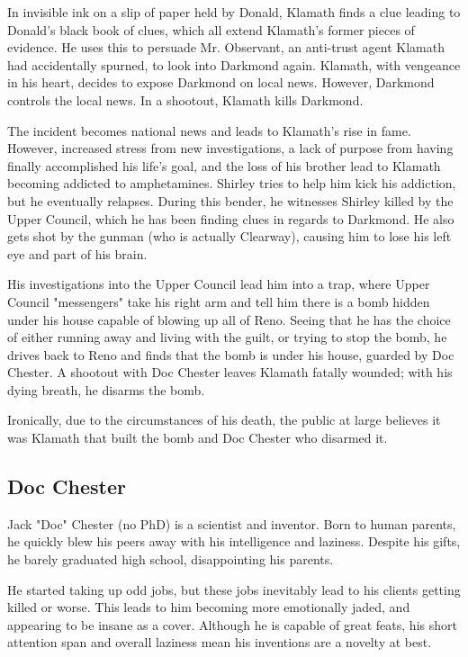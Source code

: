 \documentclass{article}
\begin{document}
In invisible ink on a slip of paper held by Donald, Klamath finds a clue leading to Donald's black book of clues, which all extend Klamath's former pieces of evidence. He uses this to persuade Mr. Observant, an anti-trust agent Klamath had accidentally spurned, to look into Darkmond again. Klamath, with vengeance in his heart, decides to expose Darkmond on local news. However, Darkmond controls the local news. In a shootout, Klamath kills Darkmond.

The incident becomes national news and leads to Klamath's rise in fame. However, increased stress from new investigations, a lack of purpose from having finally accomplished his life's goal, and the loss of his brother lead to Klamath becoming addicted to amphetamines. Shirley tries to help him kick his addiction, but he eventually relapses. During this bender, he witnesses Shirley killed by the Upper Council, which he has been finding clues in regards to Darkmond. He also gets shot by the gunman (who is actually Clearway), causing him to lose his left eye and part of his brain.

His investigations into the Upper Council lead him into a trap, where Upper Council "messengers" take his right arm and tell him there is a bomb hidden under his house capable of blowing up all of Reno. Seeing that he has the choice of either running away and living with the guilt, or trying to stop the bomb, he drives back to Reno and finds that the bomb is under his house, guarded by Doc Chester. A shootout with Doc Chester leaves Klamath fatally wounded; with his dying breath, he disarms the bomb.

Ironically, due to the circumstances of his death, the public at large believes it was Klamath that built the bomb and Doc Chester who disarmed it.

\subsection{Doc Chester}

Jack "Doc" Chester (no PhD) is a scientist and inventor. Born to human parents, he quickly blew his peers away with his intelligence and laziness. Despite his gifts, he barely graduated high school, disappointing his parents.

He started taking up odd jobs, but these jobs inevitably lead to his clients getting killed or worse. This leads to him becoming more emotionally jaded, and appearing to be insane as a cover. Although he is capable of great feats, his short attention span and overall laziness mean his inventions are a novelty at best.
\end{document}
